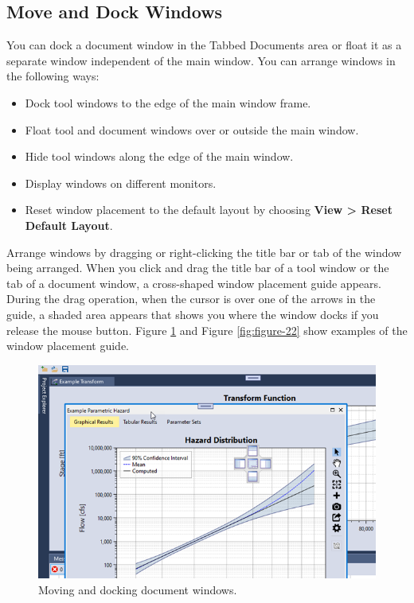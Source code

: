 \documentclass[
]{book}
\begin{document}
\hypertarget{move-and-dock-windows}{%
\subsection{Move and Dock Windows}\label{move-and-dock-windows}}

You can dock a document window in the Tabbed Documents area or float it as a separate window independent of the main window. You can arrange windows in the following ways:

\begin{itemize}
\item
  Dock tool windows to the edge of the main window frame.
\item
  Float tool and document windows over or outside the main window.
\item
  Hide tool windows along the edge of the main window.
\item
  Display windows on different monitors.
\item
  Reset window placement to the default layout by choosing \textbf{View \textgreater{} Reset Default Layout}.
\end{itemize}

Arrange windows by dragging or right-clicking the title bar or tab of the window being arranged. When you click and drag the title bar of a tool window or the tab of a document window, a cross-shaped window placement guide appears. During the drag operation, when the cursor is over one of the arrows in the guide, a shaded area appears that shows you where the window docks if you release the mouse button. Figure \ref{fig:figure-21} and Figure \ref{fig:figure-22} show examples of the window placement guide.

\begin{figure}

{\centering \includegraphics{images/figure21} 

}

\caption{Moving and docking document windows.}\label{fig:figure-21}
\end{figure}
\end{document}
